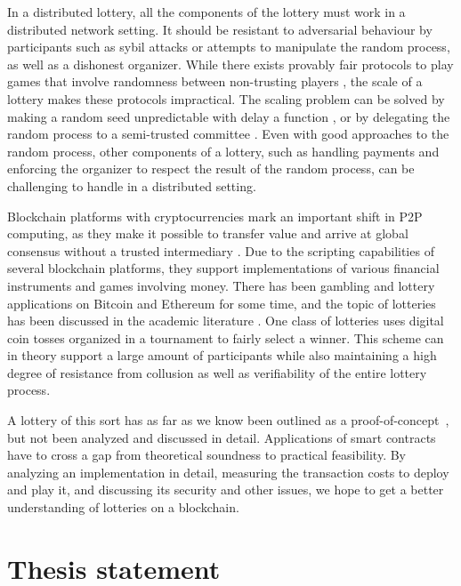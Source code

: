 In a distributed lottery, all the components of the lottery must work in a distributed network setting. It should be resistant to adversarial behaviour by participants such as sybil attacks \cite{douceur2002sybil} or attempts to manipulate the random process, as well as a dishonest organizer. While there exists provably fair protocols to play games that involve randomness between non-trusting players \cite{shamir_mental_1981, blum1983coin, broder_provably_1985, goldreich_how_1987}, the scale of a lottery makes these protocols impractical. The scaling problem can be solved by making a random seed unpredictable with delay a function \cite{goldschlag_publicly_1998}, or by delegating the random process to a semi-trusted committee \cite{fouque_sharing_2001}. Even with good approaches to the random process, other components of a lottery, such as handling payments and enforcing the organizer to respect the result of the random process, can be challenging to handle in a distributed setting. 

Blockchain platforms with cryptocurrencies mark an important shift in P2P computing, as they make it possible to transfer value and arrive at global consensus without a trusted intermediary \cite{crosby_blockchain_2016}. Due to the scripting capabilities of several blockchain platforms, they support implementations of various financial instruments and games involving money. There has been gambling and lottery applications on Bitcoin and Ethereum for some time, and the topic of lotteries has been discussed in the academic literature \cite{back_note_2014,andrychowicz_fair_2014,andrychowicz_secure_2014,bentov_how_2014,miller_zero-collateral_2017,bartoletti_constant-deposit_2017}. One class of lotteries uses digital coin tosses organized in a tournament to fairly select a winner. This scheme can in theory support a large amount of participants while also maintaining a high degree of resistance from collusion as well as verifiability of the entire lottery process.

A lottery of this sort has as far as we know been outlined as a proof-of-concept~\cite{miller_zero-collateral_2017}, but not been analyzed and discussed in detail. Applications of smart contracts have to cross a gap from theoretical soundness to practical feasibility. By analyzing an implementation in detail, measuring the transaction costs to deploy and play it, and discussing its security and other issues, we hope to get a better understanding of lotteries on a blockchain.

\section{Thesis statement}
\label{sec:statement}

